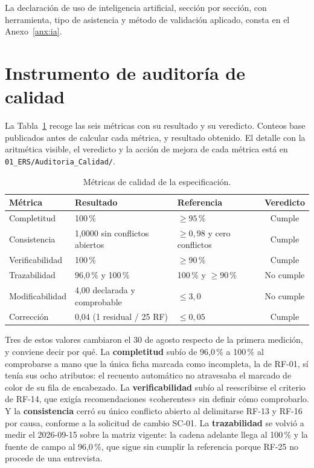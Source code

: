 \documentclass[11pt,a4paper]{article}
\begin{document}
La declaraci\'on de uso de inteligencia artificial, secci\'on por secci\'on, con
herramienta, tipo de asistencia y m\'etodo de validaci\'on aplicado, consta en el
Anexo~\ref{anx:ia}.

\newpage

\nocite{*}


\newpage
\appendix

\section{Instrumento de auditor\'ia de calidad}
\label{anx:auditoria}

La Tabla~\ref{tab:metricas} recoge las seis m\'etricas con su resultado y su veredicto. Conteos base publicados antes de calcular cada m\'etrica, y resultado obtenido. El
detalle con la aritm\'etica visible, el veredicto y la acci\'on de mejora de cada
m\'etrica est\'a en \texttt{01\_ERS/Auditoria\_Calidad/}.

\begin{table}[H]\centering\small
\caption{M\'etricas de calidad de la especificaci\'on.}
\label{tab:metricas}
\begin{tabular}{lllc}
\toprule
\textbf{M\'etrica} & \textbf{Resultado} & \textbf{Referencia} & \textbf{Veredicto} \\
\midrule
Completitud      & 100\,\% & $\geq 95$\,\%            & Cumple \\
Consistencia     & 1,0000 sin conflictos abiertos & $\geq 0{,}98$ y cero conflictos & Cumple \\
Verificabilidad  & 100\,\% & $\geq 90$\,\%            & Cumple \\
Trazabilidad     & 96,0\,\% y 100\,\% & 100\,\% y $\geq 90$\,\% & No cumple \\
Modificabilidad  & 4,00 declarada y comprobable & $\leq 3{,}0$ & No cumple \\
Correcci\'on     & 0,04 (1 residual / 25 RF) & $\leq 0{,}05$ & Cumple \\
\bottomrule
\end{tabular}
\end{table}

Tres de estos valores cambiaron el 30 de agosto respecto de la primera medici\'on, y
conviene decir por qu\'e. La \textbf{completitud} sub\'io de 96,0\,\% a 100\,\% al comprobarse
a mano que la \'unica ficha marcada como incompleta, la de RF-01, s\'i ten\'ia sus ocho
atributos: el recuento autom\'atico no atravesaba el marcado de color de su fila de
encabezado. La \textbf{verificabilidad} sub\'io al reescribirse el criterio de RF-14,
que exig\'ia recomendaciones «coherentes» sin definir c\'omo comprobarlo. Y la
\textbf{consistencia} cerr\'o su \'unico conflicto abierto al delimitarse RF-13 y RF-16
por causa, conforme a la solicitud de cambio SC-01.
La \textbf{trazabilidad} se volvi\'o a medir el 2026-09-15 sobre la matriz vigente: la
cadena adelante llega al 100\,\% y la fuente de campo al 96,0\,\%, que sigue sin cumplir la
referencia porque RF-25 no procede de una entrevista.
\end{document}
